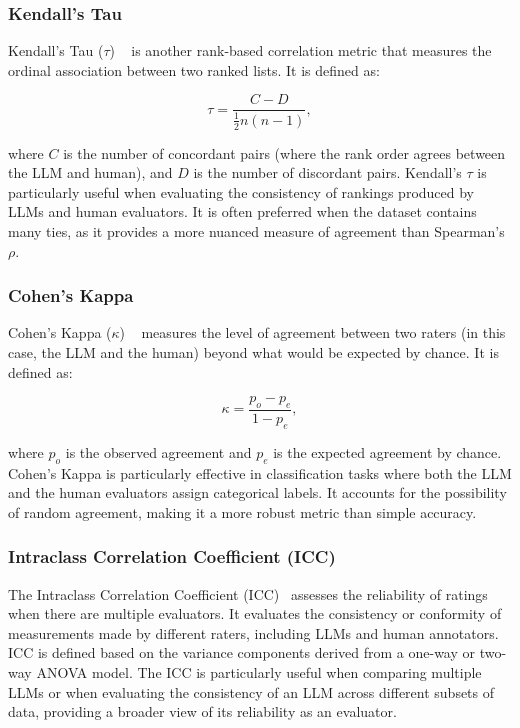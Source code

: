 \subsubsection{Kendall's Tau}

Kendall's Tau ($\tau$) ~\cite{sen1968estimates} is another rank-based correlation metric that measures the ordinal association between two ranked lists. It is defined as:

\begin{equation}
    \tau = \frac{C - D}{\frac{1}{2}n(n-1)},
\end{equation}

where $C$ is the number of concordant pairs (where the rank order agrees between the LLM and human), and $D$ is the number of discordant pairs. Kendall's $\tau$ is particularly useful when evaluating the consistency of rankings produced by LLMs and human evaluators. It is often preferred when the dataset contains many ties, as it provides a more nuanced measure of agreement than Spearman's $\rho$.

\subsubsection{Cohen's Kappa}

Cohen's Kappa ($\kappa$) ~\cite{warrens2015five} measures the level of agreement between two raters (in this case, the LLM and the human) beyond what would be expected by chance. It is defined as:

\begin{equation}
    \kappa = \frac{p_o - p_e}{1 - p_e},
\end{equation}

where $p_o$ is the observed agreement and $p_e$ is the expected agreement by chance.
Cohen's Kappa is particularly effective in classification tasks where both the LLM and the human evaluators assign categorical labels. It accounts for the possibility of random agreement, making it a more robust metric than simple accuracy.

    
\subsubsection{Intraclass Correlation Coefficient (ICC)}

The Intraclass Correlation Coefficient (ICC)~\cite{bartko1966intraclass} assesses the reliability of ratings when there are multiple evaluators. It evaluates the consistency or conformity of measurements made by different raters, including LLMs and human annotators. ICC is defined based on the variance components derived from a one-way or two-way ANOVA model.
The ICC is particularly useful when comparing multiple LLMs or when evaluating the consistency of an LLM across different subsets of data, providing a broader view of its reliability as an evaluator.


